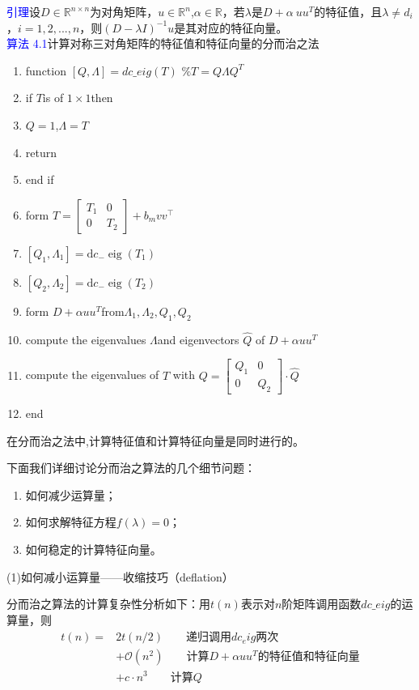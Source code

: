\documentclass[12pt,a4paper]{article}
\begin{document}
\textcolor{blue}{引理}\quad 设$D\in \mathbb R^{n\times n}$为对角矩阵，$u\in \mathbb R^n$,$\alpha \in \mathbb R$，若$\lambda$是$D+\alpha\ uu^T$的特征值，且$\lambda \neq d_i$，$i=1,2,...,n$，则$(D-\lambda I)^{-1}u$是其对应的特征向量。\\
\textcolor{blue}{算法 4.1}\quad 计算对称三对角矩阵的特征值和特征向量的分而治之法
\begin{enumerate}[1:]
	\item function $[Q,\Lambda]=dc\_eig(T)$  \quad $\%T=Q\Lambda Q^T$
	\item if $T$is of $1\times 1$then
    \item \quad $Q=1$,$\Lambda=T$
    \item \quad return
    \item end if
   	\item form $T=\left[\begin{array}{cc}{T_{1}} & {0} \\ {0} & {T_{2}}\end{array}\right]+b_{m} v v^{\top}
$
   	\item $\left[Q_{1}, \Lambda_{1}\right]=\mathrm{d} c_{-} \operatorname{eig}\left(T_{1}\right)$
   	\item $\left[Q_{2}, \Lambda_{2}\right]=\mathrm{d} c_{-} \operatorname{eig}\left(T_{2}\right)$
   	\item form $D+\alpha uu^T$from$\Lambda_{1},\Lambda_{2},Q_1,Q_2$
   	\item compute the eigenvalues $\Lambda$and eigenvectors  $\hat{Q}$ of $D+\alpha uu^T$
   	\item compute the eigenvalues of $T$ with $Q=\left[\begin{array}{cc}{Q_{1}} & {0} \\ {0} & {Q_{2}}\end{array}\right] \cdot \hat{Q}$
   	\item end
\end{enumerate}

在分而治之法中,计算特征值和计算特征向量是同时进行的。

下面我们详细讨论分而治之算法的几个细节问题：
\begin{enumerate}[(1)]
	\item 如何减少运算量；
	\item 如何求解特征方程$f(\lambda)=0$；
	\item 如何稳定的计算特征向量。
\end{enumerate}
(1)如何减小运算量——收缩技巧（deflation）

分而治之算法的计算复杂性分析如下：用$t(n)$表示对$n$阶矩阵调用函数$dc\_eig$的运算量，则
\begin{equation*}
\begin{aligned}
t(n)=&2t(n/2)\qquad \mbox{递归调用}dc_eig\mbox{两次}\\&+\mathcal{O}(n^2)\qquad  \mbox{计算}D+\alpha uu^T \mbox{的特征值和特征向量}\\&+c·n^3 \qquad \mbox{计算}Q
\end{aligned}
\end{equation*}
\end{document}
